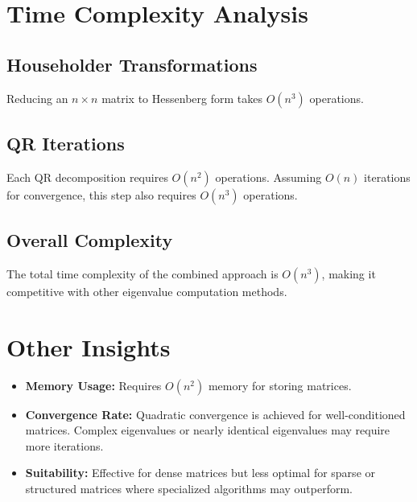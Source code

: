 \documentclass[12pt]{article}
\begin{document}
\section*{Time Complexity Analysis}
\subsection*{Householder Transformations}
Reducing an \( n \times n \) matrix to Hessenberg form takes \( O(n^3) \) operations.

\subsection*{QR Iterations}
Each QR decomposition requires \( O(n^2) \) operations. Assuming \( O(n) \) iterations for convergence, this step also requires \( O(n^3) \) operations.

\subsection*{Overall Complexity}
The total time complexity of the combined approach is \( O(n^3) \), making it competitive with other eigenvalue computation methods.

\section*{Other Insights}
\begin{itemize}
    \item \textbf{Memory Usage:} Requires \( O(n^2) \) memory for storing matrices.
    \item \textbf{Convergence Rate:} Quadratic convergence is achieved for well-conditioned matrices. Complex eigenvalues or nearly identical eigenvalues may require more iterations.
    \item \textbf{Suitability:} Effective for dense matrices but less optimal for sparse or structured matrices where specialized algorithms may outperform.
\end{itemize}
\end{document}
